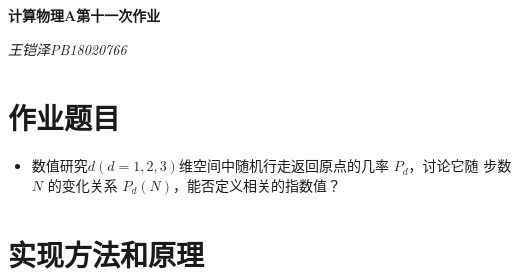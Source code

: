 \documentclass[UTF8]{ctexart}
\begin{document}
	\centering\textbf{\LARGE{计算物理A第十一次作业}}
	
	\textit{王铠泽\qquad PB18020766}
	
		
	\section{作业题目}
	
	\begin{itemize}
		\item 数值研究$  d(d=1, 2, 3) $维空间中随机行走返回原点的几率 $ P_d $，讨论它随
		步数 $ N $ 的变化关系 $ P_d(N) $，能否定义相关的指数值？
		
	\end{itemize}

	\section{实现方法和原理}
	
\end{document}
